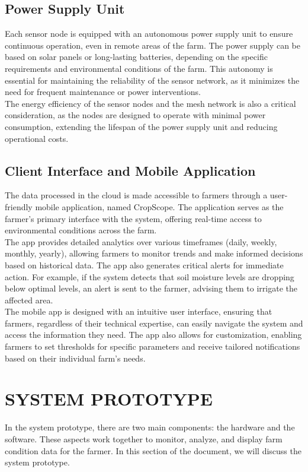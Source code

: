 \documentclass[12pt, a4paper]{article}
\begin{document}
\subsection{Power Supply Unit}
Each sensor node is equipped with an autonomous power supply unit to ensure continuous operation, even in remote areas of the farm. The power supply can be based on solar panels or long-lasting batteries, depending on the specific requirements and environmental conditions of the farm. This autonomy is essential for maintaining the reliability of the sensor network, as it minimizes the need for frequent maintenance or power interventions.\\
The energy efficiency of the sensor nodes and the mesh network is also a critical consideration, as the nodes are designed to operate with minimal power consumption, extending the lifespan of the power supply unit and reducing operational costs.

\subsection{Client Interface and Mobile Application}
The data processed in the cloud is made accessible to farmers through a user-friendly mobile application, named CropScope. The application serves as the farmer's primary interface with the system, offering real-time access to environmental conditions across the farm.\\
The app provides detailed analytics over various timeframes (daily, weekly, monthly, yearly), allowing farmers to monitor trends and make informed decisions based on historical data. The app also generates critical alerts for immediate action. For example, if the system detects that soil moisture levels are dropping below optimal levels, an alert is sent to the farmer, advising them to irrigate the affected area.\\
The mobile app is designed with an intuitive user interface, ensuring that farmers, regardless of their technical expertise, can easily navigate the system and access the information they need. The app also allows for customization, enabling farmers to set thresholds for specific parameters and receive tailored notifications based on their individual farm's needs.

\newpage
\section{SYSTEM PROTOTYPE}
In the system prototype, there are two main components: the hardware and the software. These aspects work together to monitor, analyze, and display farm condition data for the farmer. In this section of the document, we will discuss the system prototype.
\end{document}
